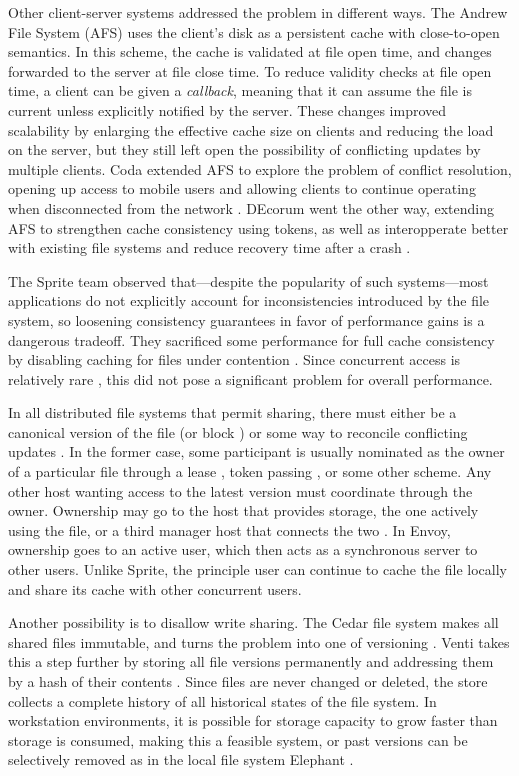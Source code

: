 Other client-server systems addressed the problem in different ways. The Andrew File System (AFS) \cite{satyanarayanan85,howard} uses the client's disk as a persistent cache with close-to-open semantics. In this scheme, the cache is validated at file open time, and changes forwarded to the server at file close time. To reduce validity checks at file open time, a client can be given a \emph{callback}, meaning that it can assume the file is current unless explicitly notified by the server. These changes improved scalability by enlarging the effective cache size on clients and reducing the load on the server, but they still left open the possibility of conflicting updates by multiple clients. Coda extended AFS to explore the problem of conflict resolution, opening up access to mobile users and allowing clients to continue operating when disconnected from the network \cite{satyanarayanan90,mummert}. DEcorum went the other way, extending AFS to strengthen cache consistency using tokens, as well as interopperate better with existing file systems and reduce recovery time after a crash \cite{kazar}.

The Sprite team observed that---despite the popularity of such systems---most applications do not explicitly account for inconsistencies introduced by the file system, so loosening consistency guarantees in favor of performance gains is a dangerous tradeoff. They sacrificed some performance for full cache consistency by disabling caching for files under contention \cite{baker91,nelson,welch}. Since concurrent access is relatively rare \cite{kistler}, this did not pose a significant problem for overall performance.

In all distributed file systems that permit sharing, there must either be a canonical version of the file (or block \cite{mcgregor}) or some way to reconcile conflicting updates \cite{kistler}. In the former case, some participant is usually nominated as the owner of a particular file through a lease \cite{gray89}, token passing \cite{burrows,mann,kazar}, or some other scheme. Any other host wanting access to the latest version must coordinate through the owner. Ownership may go to the host that provides storage, the one actively using the file, or a third manager host that connects the two \cite{blaze,keleher}. In Envoy, ownership goes to an active user, which then acts as a synchronous server to other users. Unlike Sprite, the principle user can continue to cache the file locally and share its cache with other concurrent users.

Another possibility is to disallow write sharing. The Cedar file system \cite{schroeder} makes all shared files immutable, and turns the problem into one of versioning \cite{gifford}. Venti takes this a step further by storing all file versions permanently and addressing them by a hash of their contents \cite{quinlan}. Since files are never changed or deleted, the store collects a complete history of all historical states of the file system. In workstation environments, it is possible for storage capacity to grow faster than storage is consumed, making this a feasible system, or past versions can be selectively removed as in the local file system Elephant \cite{santry}.

